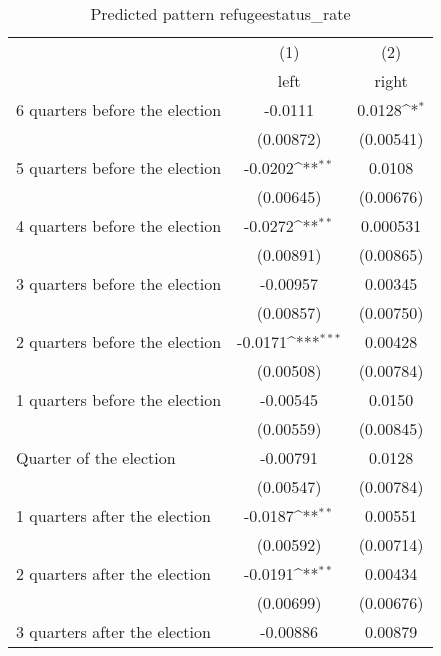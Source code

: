 \begin{table}[htbp]\centering
\def\sym#1{\ifmmode^{#1}\else\(^{#1}\)\fi}
\caption{Predicted pattern refugeestatus\_rate}
\begin{tabular}{l*{2}{c}}
\hline\hline
                    &\multicolumn{1}{c}{(1)}&\multicolumn{1}{c}{(2)}\\
                    &\multicolumn{1}{c}{left}&\multicolumn{1}{c}{right}\\
\hline
 6 quarters before the election&     -0.0111         &      0.0128\sym{*}  \\
                    &   (0.00872)         &   (0.00541)         \\
[1em]
 5 quarters before the election&     -0.0202\sym{**} &      0.0108         \\
                    &   (0.00645)         &   (0.00676)         \\
[1em]
 4 quarters before the election&     -0.0272\sym{**} &    0.000531         \\
                    &   (0.00891)         &   (0.00865)         \\
[1em]
 3 quarters before the election&    -0.00957         &     0.00345         \\
                    &   (0.00857)         &   (0.00750)         \\
[1em]
 2 quarters before the election&     -0.0171\sym{***}&     0.00428         \\
                    &   (0.00508)         &   (0.00784)         \\
[1em]
 1 quarters before the election&    -0.00545         &      0.0150         \\
                    &   (0.00559)         &   (0.00845)         \\
[1em]
Quarter of the election&    -0.00791         &      0.0128         \\
                    &   (0.00547)         &   (0.00784)         \\
[1em]
 1 quarters after the election&     -0.0187\sym{**} &     0.00551         \\
                    &   (0.00592)         &   (0.00714)         \\
[1em]
 2 quarters after the election&     -0.0191\sym{**} &     0.00434         \\
                    &   (0.00699)         &   (0.00676)         \\
[1em]
 3 quarters after the election&    -0.00886         &     0.00879         \\

\end{tabular}
\end{table}
